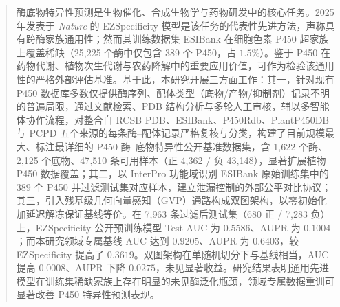 

\begin{abstract}
  酶底物特异性预测是生物催化、合成生物学与药物研发中的核心任务。2025 年发表于 \textit{Nature} 的 EZSpecificity 模型是该任务的代表性先进方法，声称具有跨酶家族通用性；然而其训练数据集 ESIBank 在细胞色素 P450 超家族上覆盖稀缺（25{,}225 个酶中仅包含 389 个 P450，占 $1.5\%$）。鉴于 P450 在药物代谢、植物次生代谢与农药降解中的重要应用价值，可作为检验该通用性的严格外部评估基准。基于此，本研究开展三方面工作：其一，针对现有 P450 数据库多数仅提供酶序列、配体类型（底物/产物/抑制剂）记录不明的普遍局限，通过文献检索、PDB 结构分析与多轮人工审核，辅以多智能体协作流程，对整合自 RCSB PDB、ESIBank、P450Rdb、PlantP450DB 与 PCPD 五个来源的每条酶--配体记录严格复核与分类，构建了目前规模最大、标注最详细的 P450 酶--底物特异性公开基准数据集，含 1{,}622 个酶、2{,}125 个底物、47{,}510 条可用样本（正 4{,}362 / 负 43{,}148），显著扩展植物 P450 数据覆盖；其二，以 InterPro 功能域识别 ESIBank 原始训练集中的 389 个 P450 并过滤测试集对应样本，建立泄漏控制的外部公平对比协议；其三，引入残基级几何向量感知（GVP）通路构成双图架构，以零初始化加延迟解冻保证基线等价。在 7{,}963 条过滤后测试集（680 正 / 7{,}283 负）上，EZSpecificity 公开预训练模型 Test AUC 为 $0.5586$、AUPR 为 $0.1004$；而本研究领域专属基线 AUC 达到 $0.9205$、AUPR 为 $0.6403$，较 EZSpecificity 提高了 $0.3619$。双图架构在单随机切分下与基线相当，AUC 提高 $0.0008$、AUPR 下降 $0.0275$，未见显著收益。研究结果表明通用先进模型在训练集稀缺家族上存在明显的未见酶泛化瓶颈，领域专属数据重训可显著改善 P450 特异性预测表现。
\end{abstract}

